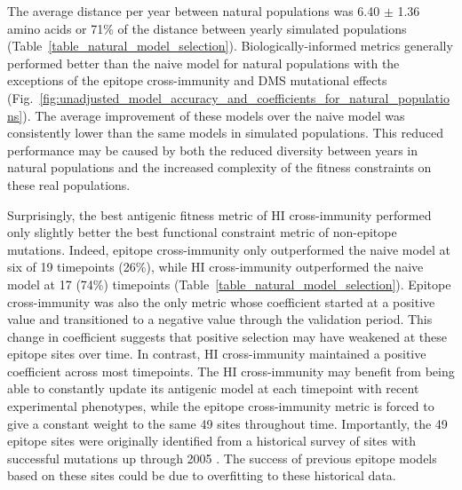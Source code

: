The average distance per year between natural populations was 6.40 $\pm$ 1.36 amino acids or 71\% of the distance between yearly simulated populations (Table~\ref{table_natural_model_selection}).
Biologically-informed metrics generally performed better than the naive model for natural populations with the exceptions of the epitope cross-immunity and DMS mutational effects (Fig.~\ref{fig:unadjusted_model_accuracy_and_coefficients_for_natural_populations}).
The average improvement of these models over the naive model was consistently lower than the same models in simulated populations.
This reduced performance may be caused by both the reduced diversity between years in natural populations and the increased complexity of the fitness constraints on these real populations.

Surprisingly, the best antigenic fitness metric of HI cross-immunity performed only slightly better the best functional constraint metric of non-epitope mutations.
Indeed, epitope cross-immunity only outperformed the naive model at six of 19 timepoints (26\%), while HI cross-immunity outperformed the naive model at 17 (74\%) timepoints (Table~\ref{table_natural_model_selection}).
Epitope cross-immunity was also the only metric whose coefficient started at a positive value and transitioned to a negative value through the validation period.
This change in coefficient suggests that positive selection may have weakened at these epitope sites over time.
In contrast, HI cross-immunity maintained a positive coefficient across most timepoints.
The HI cross-immunity may benefit from being able to constantly update its antigenic model at each timepoint with recent experimental phenotypes, while the epitope cross-immunity metric is forced to give a constant weight to the same 49 sites throughout time.
Importantly, the 49 epitope sites were originally identified from a historical survey of sites with successful mutations up through 2005 \cite{Shih:2007bd}.
The success of previous epitope models based on these sites could be due to overfitting to these historical data.

